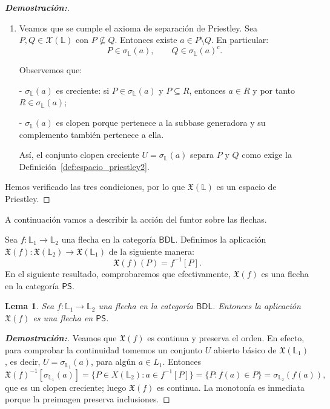\documentclass[12pt]{book}
\newtheorem{lemma}[theorem]{Lema}
\newcommand{\PS}{\mathsf{PS}}
\newcommand{\X}{\mathfrak{X}}
\begin{document}
\begin{proof}[{\textbf{Demostración:}}]
\begin{enumerate}[\normalfont (1)]
\item Veamos que se cumple el axioma de separación de Priestley. Sea $P,Q\in\mathcal{X}(\mathbb L)$ con $P\nsubseteq Q$.  
Entonces existe $a\in P\setminus Q$. En particular:
\[
P\in\sigma_{\mathbb L}(a),\qquad Q\in\sigma_{\mathbb L}(a)^c.
\]

Observemos que:

- $\sigma_{\mathbb L}(a)$ es creciente: si $P\in\sigma_{\mathbb L}(a)$ y $P\subseteq R$, entonces $a\in R$ y por tanto $R\in\sigma_{\mathbb L}(a)$;

- $\sigma_{\mathbb L}(a)$ es clopen porque pertenece a la subbase generadora y su complemento también pertenece a ella.

Así, el conjunto clopen creciente $U=\sigma_{\mathbb L}(a)$ separa $P$ y $Q$ como exige la Definición~\ref{def:espacio_priestley2}.

\end{enumerate}

\medskip

Hemos verificado las tres condiciones, por lo que $\X(\mathbb L)$ es un espacio de Priestley.
\end{proof}
\medskip



A continuación vamos a describir la acción del funtor sobre las flechas.

Sea \( f\colon \mathbb{L}_{1}\to\mathbb{L}_{2} \) una flecha en la categoría \( \mathsf{BDL} \). Definimos la aplicación $\X(f)\colon \X(\mathbb{L}_{2}) \to \X(\mathbb{L}_{1})$ de la siguiente manera:
\[ \X(f)(P)=f^{-1}[P]. \]
En el siguiente resultado, comprobaremos que efectivamente, $\X(f)$ es una flecha en la categoría $\PS$.

\begin{lemma}\label{lem:X-cont-mon} 
Sea \( f\colon \mathbb{L}_{1}\to\mathbb{L}_{2} \) una flecha en la categoría $\mathsf{BDL}$. Entonces
la aplicación \( \X(f) \) es una flecha en $\PS$.
\end{lemma}

\begin{proof}[{\textbf{Demostración:}}] 
Veamos que $\X(f)$ es continua y preserva el orden. En efecto, para comprobar la continuidad tomemos un conjunto $U$ abierto básico de $\X(\mathbb{L}_{1})$, es decir, $U = \sigma_{\mathbb{L}_{1}}(a)$, para algún  \( a\in L_{1} \). Entonces
\[
\X(f)^{-1}[\sigma_{\mathbb{L}_{1}}(a)]
  = \{P\in X(\mathbb{L}_{2}) : a\in f^{-1}[P]\}
  = \{P : f(a)\in P\}
  = \sigma_{\mathbb{L}_{2}}(f(a)),
\]
que es un clopen creciente; luego \( \X(f) \) es continua.
La monotonía es inmediata porque la preimagen preserva inclusiones.
\end{proof}
\end{document}
